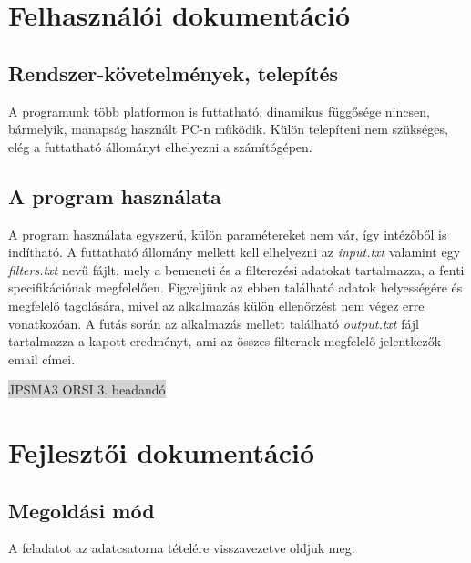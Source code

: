 \documentclass[12pt]{article}
\begin{document}
\section{Felhasználói dokumentáció}

\subsection{Rendszer-követelmények, telepítés}

A programunk több platformon is futtatható, dinamikus függősége nincsen, bármelyik, manapság
használt PC-n működik. Külön telepíteni nem szükséges, elég a futtatható állományt elhelyezni
a számítógépen.

\subsection{A program használata}

A program használata egyszerű, külön paramétereket nem vár, így intézőből is indítható. A
futtatható állomány mellett kell elhelyezni az \textit{input.txt} valamint egy 
\textit{filters.txt} nevű fájlt, mely a bemeneti és a filterezési
adatokat tartalmazza, a fenti specifikációnak megfelelően. Figyeljünk az ebben található
adatok helyességére és megfelelő tagolására, mivel az alkalmazás külön ellenőrzést nem végez
erre vonatkozóan. A futás során az alkalmazás mellett található \textit{output.txt} fájl
tartalmazza a kapott eredményt, ami az összes filternek megfelelő jelentkezők email címei.

\newpage
\thispagestyle{empty}
\begin{center}
	\colorbox{lightgray}{{\large JPSMA3} \hspace{4.3cm} {\large ORSI 3. beadandó} \hspace{5.7cm} \thepage}
\end{center}

\section{Fejlesztői dokumentáció}

\subsection{Megoldási mód}
A feladatot az adatcsatorna tételére visszavezetve oldjuk meg.
\end{document}
